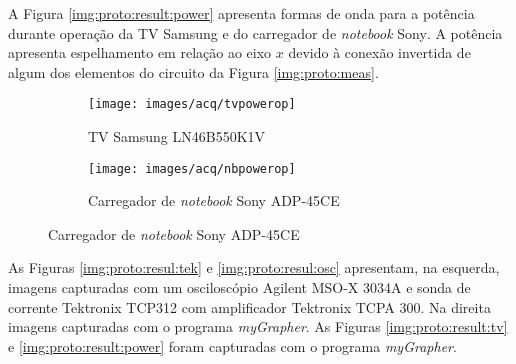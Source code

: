 		A Figura \ref{img:proto:result:power} apresenta formas de onda para a potência durante operação da TV Samsung\textsuperscript{\textregistered} e do carregador de \textit{notebook} Sony\textsuperscript{\textregistered}. A potência apresenta espelhamento em relação ao eixo $x$ devido à conexão invertida de algum dos elementos do circuito da Figura \ref{img:proto:meas}.

		\begin{figure}
			\caption{Potência durante operação}
			\label{img:proto:result:power}
			\centering
			\begin{subfigure}{0.47\linewidth}
				\caption{TV Samsung\textsuperscript{\textregistered} LN46B550K1V}
				\texttt{[image: images/acq/tvpowerop]}
			\end{subfigure}
			\hspace*{0.02\linewidth}
			\begin{subfigure}{0.47\linewidth}
				\caption{Carregador de \textit{notebook} Sony\textsuperscript{\textregistered} ADP-45CE}
				\texttt{[image: images/acq/nbpowerop]}
			\end{subfigure}
		\end{figure}

		As Figuras \ref{img:proto:resul:tek} e \ref{img:proto:resul:osc} apresentam, na esquerda, imagens capturadas com um osciloscópio Agilent\textsuperscript{\textregistered} MSO-X 3034A e sonda de corrente Tektronix\textsuperscript{\textregistered} TCP312 com amplificador Tektronix\textsuperscript{\textregistered} TCPA 300. Na direita imagens capturadas com o programa \textit{myGrapher}. As Figuras \ref{img:proto:result:tv} e \ref{img:proto:result:power} foram capturadas com o programa \textit{myGrapher}.


